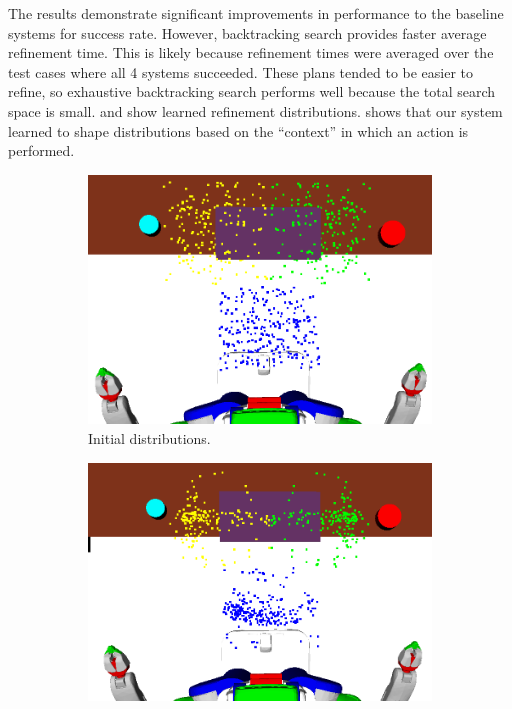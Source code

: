 The results demonstrate significant improvements in performance to the baseline systems for success rate.
However, backtracking search provides faster average refinement time. This is likely because
refinement times were averaged over the test cases where all 4 systems succeeded. These plans tended
to be easier to refine, so exhaustive backtracking search performs well because the total search space is small.
 and  show learned refinement distributions.  shows
that our system learned to shape distributions based on the ``context'' in which an action is performed.

\begin{figure}[t]
  \centering
  \begin{subfigure}[b]{0.45\linewidth}
    \includegraphics[width=\textwidth]{images/dinner_tray_initial.png}
    \caption{Initial distributions.}
  \end{subfigure}
  \begin{subfigure}[b]{0.45\linewidth}
    \includegraphics[width=\textwidth]{images/dinner_tray_final.png}

\end{subfigure}
\end{figure}
